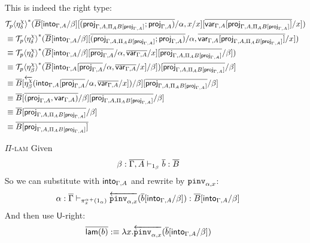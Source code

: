 \documentclass[10pt]{article}
\theoremstyle{definition}
\newcommand{\yields}{\vdash}
\newcommand{\rewrite}[2]{\overleftarrow{#1}(#2)}
\newcommand\UI[2]{\ensuremath{\lambda #1.#2}}
\newcommand\St[2]{\ensuremath{{#1}^*(#2)}}
\newcommand\TrPlus[2]{\ensuremath{{#1}^+(#2)}}
\newcommand\ApEl[2]{\mathcal{T}_{#1}\langle#2\rangle}
\begin{document}
\begin{enumerate}
This is indeed the right type:
\begin{align*}
&\St{\ApEl{p}{\eta^\chi_\delta}}{\upstairs{B}[\into{\Gamma, A}/\beta][\upstairs{(\proj{\Gamma, A, \Pi_A B[\proj{\Gamma, A}]};\proj{\Gamma, A})}/\alpha, x/x][\upstairs{\qvar{\Gamma, A}[\proj{\Gamma, A, \Pi_A B[\proj{\Gamma, A}]}]}/x]} \\
&\equiv \St{\ApEl{p}{\eta^\chi_\delta}}{\upstairs{B}[\into{\Gamma, A}/\beta][\upstairs{(\proj{\Gamma, A, \Pi_A B[\proj{\Gamma, A}]};\proj{\Gamma, A})}/\alpha, \upstairs{\qvar{\Gamma, A}[\proj{\Gamma, A, \Pi_A B[\proj{\Gamma, A}]}]}/x]} \\
&\equiv \St{\ApEl{p}{\eta^\chi_\delta}}{\upstairs{B}[\into{\Gamma, A}/\beta][\upstairs{\proj{\Gamma, A}}/\alpha, \upstairs{\qvar{\Gamma, A}}/x][\upstairs{\proj{\Gamma, A, \Pi_A B[\proj{\Gamma, A}]}}/\beta]} \\
&\equiv \St{\ApEl{p}{\eta^\chi_\beta}}{\upstairs{B}[\into{\Gamma, A}[\upstairs{\proj{\Gamma, A}}/\alpha, \upstairs{\qvar{\Gamma, A}}/x]/\beta]}[\upstairs{\proj{\Gamma, A, \Pi_A B[\proj{\Gamma, A}]}}/\beta] \\
&\equiv \upstairs{B}[\rewrite{\eta^\chi_\beta}{\into{\Gamma, A}[\upstairs{\proj{\Gamma, A}}/\alpha, \upstairs{\qvar{\Gamma, A}}/x]}/\beta][\upstairs{\proj{\Gamma, A, \Pi_A B[\proj{\Gamma, A}]}}/\beta] \\
&\equiv \upstairs{B}[\upstairs{(\proj{\Gamma, A}, \qvar{\Gamma, A})}/\beta][\upstairs{\proj{\Gamma, A, \Pi_A B[\proj{\Gamma, A}]}}/\beta] \\
&\equiv \upstairs{B}[\upstairs{\proj{\Gamma, A, \Pi_A B[\proj{\Gamma, A}]}}/\beta] \\
&\equiv \upstairs{B[\proj{\Gamma, A, \Pi_A B[\proj{\Gamma, A}]}]}
\end{align*}


\item[\textsc{$\Pi$-lam}] Given
\begin{align*}
\beta : \upstairs{\Gamma, A} \yields_{1_\beta} \upstairs{b} : \upstairs{B}
\end{align*}
So we can substitute with $\mathsf{into}_{\Gamma, A}$ and rewrite by $\mathtt{pinv}_{\alpha,x}$:
\begin{align*}
\alpha : \upstairs{\Gamma} \yields_{\TrPlus{\pi^\alpha_x}{1_{\alpha}}} \rewrite{\pinv{\alpha,x}}{\upstairs{b}[\into{\Gamma, A}/\beta]} : \upstairs{B}[\into{\Gamma, A}/\beta]
\end{align*}
And then use $\mathsf{U}$-right: 
\begin{align*}
\upstairs{\qlam(b)} :\equiv \UI{x}{\rewrite{\pinv{\alpha,x}}{\upstairs{b}[\into{\Gamma, A}/\beta]}}
\end{align*}
\end{enumerate}
\end{document}
